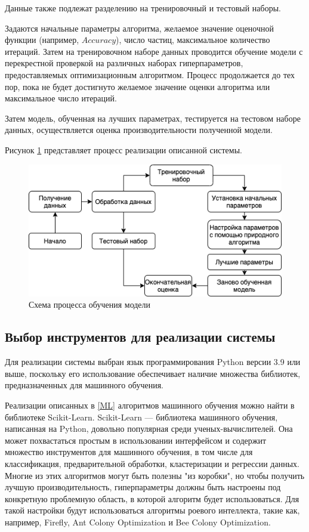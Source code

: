 Данные также подлежат разделению на тренировочный и тестовый наборы.

Задаются начальные параметры алгоритма, желаемое значение оценочной функции (например, $Accuracy$),
число частиц, максимальное количество итераций. Затем на тренировочном наборе данных
проводится обучение модели с перекрестной проверкой на различных наборах
гиперпараметров, предоставляемых оптимизационным алгоритмом. Процесс продолжается
до тех пор, пока не будет достигнуто желаемое значение оценки алгоритма или
максимальное число итераций.

Затем модель, обученная на лучших параметрах, тестируется на тестовом наборе данных,
осуществляется оценка производительности полученной модели.

Рисунок \ref{scheme} представляет процесс реализации описанной системы.

\begin{figure}[H]
      \centering
      \includegraphics[width=140mm]{static/prog.png}
      \caption{Схема процесса обучения модели}
      \label{scheme}
\end{figure}

\subsection{Выбор инструментов для реализации системы}

Для реализации системы выбран язык программирования Python версии 3.9 или выше,
поскольку его использование обеспечивает наличие множества библиотек,
предназначенных для машинного обучения.

Реализации описанных в \ref{ML} алгоритмов машинного обучения
можно найти в библиотеке Scikit-Learn. Scikit-Learn —
библиотека машинного обучения, написанная на Python, довольно популярная
среди ученых-вычислителей. Она может похвастаться простым в использовании
интерфейсом и содержит множество инструментов для машинного обучения, в том числе
для классификация, предварительной обработки, кластеризации и регрессии данных.
Многие из этих алгоритмов могут быть полезны "из коробки", но чтобы получить
лучшую производительность, гиперпараметры должны быть настроены под конкретную
проблемную область, в которой алгоритм будет использоваться. Для такой настройки
будут использоваться алгоритмы роевого интеллекта, такие как, например, Firefly, Ant
Colony Optimization и Bee Colony Optimization.
